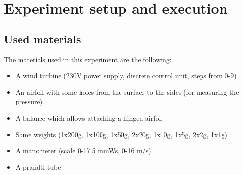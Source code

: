 \documentclass{scrreprt}
\begin{document}
\section{Experiment setup and execution}
\subsection{Used materials}
The materials used in this experiment are the following:
\begin{itemize}
\item A wind turbine (230V power supply, discrete control unit, steps from 0-9)
\item An airfoil with some holes from the surface to the sides (for measuring the pressure)
\item A balance which allows attaching a hinged airfoil
\item Some weights (1x200g, 1x100g, 1x50g, 2x20g, 1x10g, 1x5g, 2x2g, 1x1g)
\item A manometer (scale 0-17.5 mmWs, 0-16 m/s)
\item A prandtl tube
\end{itemize}
\end{document}
